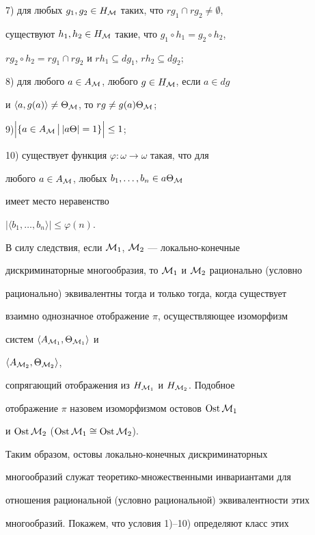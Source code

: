 7) для любых $g_1,g_2\in H_{{\cal M}}$ таких, что $rg_1\cap rg_2\neq\emptyset$,


существуют $h_1,h_2\in H_{{\cal M}}$ такие, что $g_1\circ h_1=g_2\circ h_2$,


$rg_2\circ h_2=rg_1\cap rg_2$ и $rh_1\subseteq dg_1$, $rh_2\subseteq dg_2$;





8) для любого $a\in A_{{\cal M}}$, любого $g\in H_{{\cal M}}$, если $a\in dg$


и $\langle a,g(a)\rangle\neq\Theta_{{\cal M}}$, то $rg\neq g(a)\Theta_{{\cal M}}$;





9)$\Big|\{a\in A_{{\cal M}}\,\big|\,|a\Theta|=1\}\Big| \leq 1$;





10) существует функция $\varphi:\omega\to\omega$ такая, что для


любого $a\in A_{{\cal M}}$, любых $b_1,\dotsc,b_n\in a\Theta_{{\cal M}}$


имеет место неравенство


$|\langle b_1,\dotsc,b_n\rangle|\leq\varphi(n)$.





В силу следствия, если ${\cal M}_1$, ${\cal M}_2$ --- локально-конечные


дискриминаторные многообразия, то ${\cal M}_1$ и ${\cal M}_2$ рационально (условно


рационально) эквивалентны тогда и только тогда, когда существует


взаимно однозначное отображение $\pi$, осуществляющее изоморфизм


систем $\langle A_{{\cal M}_1},\Theta_{{\cal M}_1}\rangle$ и


$\langle A_{{\cal M}_2},\Theta_{{\cal M}_2}\rangle$,


сопрягающий отображения из $H_{{\cal M}_1}$ и $H_{{\cal M}_2}$. Подобное


отображение $\pi$ назовем изоморфизмом остовов $\operatorname{Ost}{\cal M}_1$


и $\operatorname{Ost}{\cal M}_2$ ($\operatorname{Ost}{\cal M}_1\cong\operatorname{Ost}{\cal M}_2$).


Таким образом, остовы локально-конечных дискриминаторных


многообразий служат теоретико-множественными инвариантами для


отношения рациональной (условно рациональной) эквивалентности этих


многообразий. Покажем, что условия 1)--10) определяют класс этих


